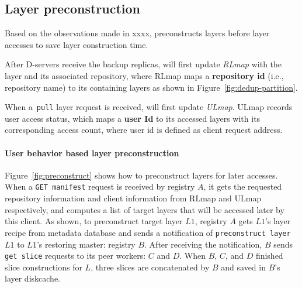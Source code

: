 
\subsection{Layer preconstruction}
\label{sec:cache-design}


%

Based on the observations made in xxxx,
\sysname preconstructs layers before layer accesses to save layer construction time.

 After D-servers receive the backup replicas,
\sysname will first update \emph{RLmap} with the layer and its associated repository, where
RLmap maps a \textbf{repository id} (i.e., repository name) to its containing layers 
as shown in Figure~\ref{fig:dedup-partition}.

When a~\texttt{pull} layer request is received, 
\sysname will first update \emph{ULmap}. 
ULmap records user access status,
which maps a \textbf{user Id} to its accessed layers with its corresponding access count,
where user id is defined as client request address.

\paragraph{User behavior based layer preconstruction}


Figure~\ref{fig:preconstruct}
shows how to preconstruct layers for later accesses.
When a \texttt{GET manifest} request is received by registry $A$,
it gets the requested repository information and client information from RLmap and ULmap respectively, 
and computes a list of target layers that will be accessed later by this client.
As shown, to preconstruct target layer $L1$, 
registry $A$ gets $L1$'s layer recipe from metadata database
and sends a notification of \texttt{preconstruct layer} $L1$ to 
$L1$'s restoring master: registry $B$. 
After receiving the notification, 
$B$ sends \texttt{get slice} requests to its peer workers: $C$ and $D$.
When $B$, $C$, and $D$ finished slice constructions for $L$,
three slices are concatenated by $B$ and saved in $B$'s layer diskcache. 

